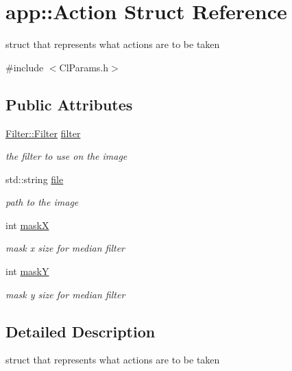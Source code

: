 \hypertarget{structapp_1_1_action}{}\section{app\+:\+:Action Struct Reference}
\label{structapp_1_1_action}


struct that represents what actions are to be taken  




{\ttfamily \#include $<$Cl\+Params.\+h$>$}

\subsection*{Public Attributes}
\begin{DoxyCompactItemize}
\item 
\hyperlink{namespaceapp_1_1_filter_a2945c335b9c131d8983b181e876d7b00}{Filter\+::\+Filter} \hyperlink{structapp_1_1_action_a6c59528c4901062a44724baaec110863}{filter}
\begin{DoxyCompactList}\small\item\em the filter to use on the image \end{DoxyCompactList}\item 
std\+::string \hyperlink{structapp_1_1_action_a5278227adf8f3e350617892aea5b81ef}{file}
\begin{DoxyCompactList}\small\item\em path to the image \end{DoxyCompactList}\item 
int \hyperlink{structapp_1_1_action_a230679b65de36e25f6ad0a4775cea934}{mask\+X}
\begin{DoxyCompactList}\small\item\em mask x size for median filter \end{DoxyCompactList}\item 
int \hyperlink{structapp_1_1_action_afe83b5f2be56b2282be6f81e0c2d6e28}{mask\+Y}
\begin{DoxyCompactList}\small\item\em mask y size for median filter \end{DoxyCompactList}\end{DoxyCompactItemize}


\subsection{Detailed Description}
struct that represents what actions are to be taken 


